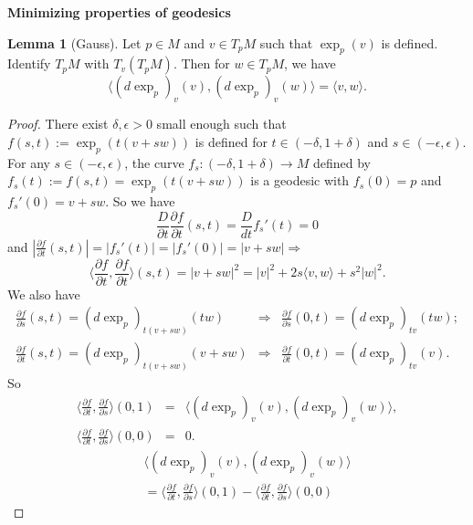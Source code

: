 \documentclass{amsart}
\numberwithin{equation}{section}
\theoremstyle{definition}
\theoremstyle{theorem}
\newtheorem{lemma}[definition]{Lemma}
\begin{document}
\medskip

\noindent
{\bf \large Minimizing properties of geodesics}

\begin{lemma}[Gauss]
Let $p \in M$ and $v \in T_pM$ such that $\exp_p(v)$ is defined. Identify $T_pM$ with $T_v(T_pM)$. Then for $w \in T_pM$, we have 
\[
\langle (d \exp_p)_v(v), (d \exp_p)_v(w) \rangle= \langle v, w \rangle.
\]
\end{lemma}

\begin{proof} There exist $\delta, \epsilon >0$ small enough such that
$f(s,t):= \exp_p(t(v+sw))$ is defined for $t\in (-\delta,1+\delta)$ and $s\in (-\epsilon, \epsilon)$.
For any $s\in (-\epsilon,\epsilon)$, the curve $f_s:(-\delta, 1+\delta)\to M$ defined by $f_s(t):= f(s,t)=\exp_p(t(v+sw))$ is a geodesic
with $f_s(0)=p$ and $f_s'(0)=v+sw$. So we have
\begin{equation}\label{eqn:ftt}
\frac{D}{\partial t}\frac{\partial f}{\partial t}(s,t)= \frac{D}{dt}f_s'(t)= 0
\end{equation}
and $|\frac{\partial f}{\partial t}(s,t)|= |f_s'(t)|= |f_s'(0)|=|v+sw|\Rightarrow$
\begin{equation}\label{eqn:ft}
\langle \frac{\partial f}{\partial t},\frac{\partial f}{\partial t}\rangle (s,t)= |v+sw|^2 = |v|^2+ 2s\langle v, w\rangle + s^2|w|^2. 
\end{equation}
We also have
\begin{eqnarray*}
\frac{\partial f}{\partial s}(s,t)=(d\exp_p)_{t(v+sw)}(tw) & \Rightarrow&  \frac{\partial f}{\partial s}(0,t)=  (d\exp_p)_{tv}(tw);\\
\frac{\partial f}{\partial t}(s,t)=(d\exp_p)_{t(v+sw)}(v+sw) & \Rightarrow&  \frac{\partial f}{\partial t}(0,t)= (d\exp_p)_{tv}(v).
\end{eqnarray*}
So 
\begin{eqnarray*}
\langle \frac{\partial f}{\partial t}, \frac{\partial f}{\partial s}\rangle (0,1) &=&  \langle (d \exp_p)_v(v), (d \exp_p)_v(w) \rangle ,\\
\langle \frac{\partial f}{\partial t}, \frac{\partial f}{\partial s}\rangle (0,0) &=& 0.
\end{eqnarray*}
\begin{eqnarray*}
&& \langle (d \exp_p)_v(v), (d \exp_p)_v(w) \rangle\\
&& =\langle \frac{\partial f}{\partial t}, \frac{\partial f}{\partial s}\rangle (0,1)- \langle \frac{\partial f}{\partial t}, \frac{\partial f}{\partial s}\rangle (0,0)

\end{eqnarray*}
\end{proof}
\end{document}
